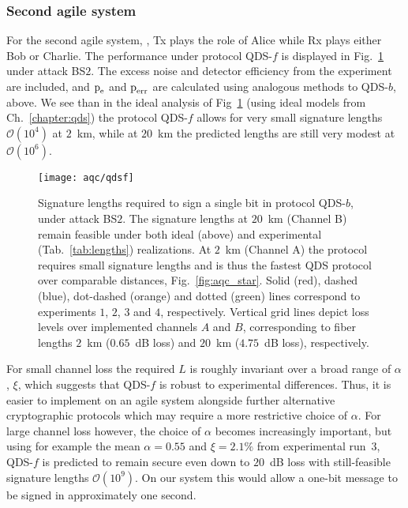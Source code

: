 \subsubsection{Second agile system \systemF}
For the second agile system, \systemF, Tx plays the role of Alice while Rx plays either Bob or Charlie. The performance under protocol QDS-$f$ is displayed in Fig.~\ref{fig:aqc_qdsf} under attack BS$2$. The excess noise and detector efficiency from the experiment are included, and $\text{p}_{\text{e}}$ and $\text{p}_{\text{err}}$ are calculated using analogous methods to QDS-$b$, above. We see than in the ideal analysis of Fig~\ref{fig:aqc_qdsf} (using ideal models from Ch.~\ref{chapter:qds}) the protocol QDS-$f$ allows for very small signature lengths $\mathcal{O}\left(10^4\right)$ at $2$~km, while at $20$~km the predicted lengths are still very modest at $\mathcal{O}\left(10^6\right)$.

\begin{figure}[htp]
\captionsetup{width=\linewidth}
\centering
\texttt{[image: aqc/qdsf]}
\caption{\label{fig:aqc_qdsf} Signature lengths required to sign a single bit in protocol QDS-$b$, under attack BS$2$. The signature lengths at $20$~km (Channel B) remain feasible under both ideal (above) and experimental (Tab.~\ref{tab:lengths}) realizations. At $2$~km (Channel A) the protocol requires small signature lengths and is thus the fastest QDS protocol over comparable distances, Fig.~\ref{fig:aqc_star}. Solid (red), dashed (blue), dot-dashed (orange) and dotted (green) lines correspond to experiments $1$, $2$, $3$ and $4$, respectively. Vertical grid lines depict loss levels over implemented channels $A$ and $B$, corresponding to fiber lengths $2$~km ($0.65$~dB loss) and $20$~km ($4.75$~dB loss), respectively.}
\end{figure}

For small channel loss the required $L$ is roughly invariant over a broad range of $\alpha$, $\xi$, which suggests that QDS-$f$ is robust to experimental differences. Thus, it is easier to implement on an agile system alongside further alternative cryptographic protocols which may require a more restrictive choice of $\alpha$. For large channel loss however, the choice of $\alpha$ becomes increasingly important, but using for example the mean $\alpha = 0.55$ and $\xi = 2.1\%$ from experimental run~$3$, QDS-$f$ is predicted to remain secure even down to $20$~dB loss with still-feasible signature lengths $\mathcal{O}\left(10^9\right)$. On our system this would allow a one-bit message to be signed in approximately one second.

